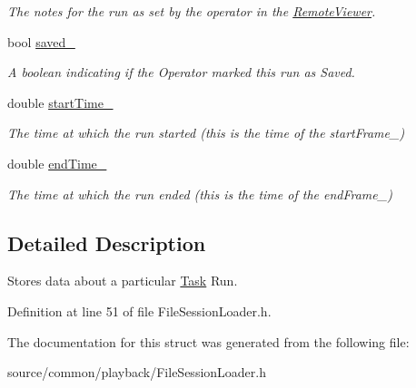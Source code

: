 \begin{DoxyCompactItemize}
\begin{DoxyCompactList}\small\item\em The notes for the run as set by the operator in the \hyperlink{class_remote_viewer}{Remote\-Viewer}. \end{DoxyCompactList}\item 
\hypertarget{struct_picto_1_1_file_session_loader_1_1_run_data_a1bbe00dbc0c04496a340d418a72bfb02}{bool \hyperlink{struct_picto_1_1_file_session_loader_1_1_run_data_a1bbe00dbc0c04496a340d418a72bfb02}{saved\-\_\-}}\label{struct_picto_1_1_file_session_loader_1_1_run_data_a1bbe00dbc0c04496a340d418a72bfb02}

\begin{DoxyCompactList}\small\item\em A boolean indicating if the Operator marked this run as Saved. \end{DoxyCompactList}\item 
\hypertarget{struct_picto_1_1_file_session_loader_1_1_run_data_af1e2fa8297c653cd42a95a63328bb079}{double \hyperlink{struct_picto_1_1_file_session_loader_1_1_run_data_af1e2fa8297c653cd42a95a63328bb079}{start\-Time\-\_\-}}\label{struct_picto_1_1_file_session_loader_1_1_run_data_af1e2fa8297c653cd42a95a63328bb079}

\begin{DoxyCompactList}\small\item\em The time at which the run started (this is the time of the start\-Frame\-\_\-) \end{DoxyCompactList}\item 
\hypertarget{struct_picto_1_1_file_session_loader_1_1_run_data_a7936eb532ab0f519fb36c741a1db74a5}{double \hyperlink{struct_picto_1_1_file_session_loader_1_1_run_data_a7936eb532ab0f519fb36c741a1db74a5}{end\-Time\-\_\-}}\label{struct_picto_1_1_file_session_loader_1_1_run_data_a7936eb532ab0f519fb36c741a1db74a5}

\begin{DoxyCompactList}\small\item\em The time at which the run ended (this is the time of the end\-Frame\-\_\-) \end{DoxyCompactList}\end{DoxyCompactItemize}


\subsection{Detailed Description}
Stores data about a particular \hyperlink{class_picto_1_1_task}{Task} Run. 

Definition at line 51 of file File\-Session\-Loader.\-h.



The documentation for this struct was generated from the following file\-:\begin{DoxyCompactItemize}
\item 
source/common/playback/File\-Session\-Loader.\-h\end{DoxyCompactItemize}

